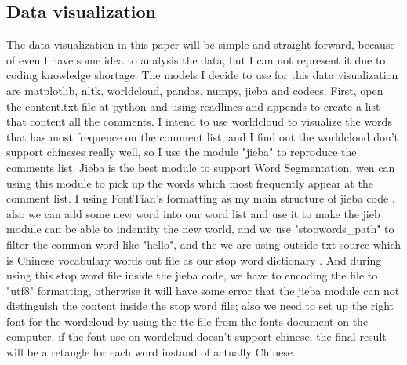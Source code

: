 \documentclass[sigconf]{acmart}
\begin{document}
\subsection{Data visualization}
The data visualization in this paper will be simple and straight forward, because of even I have some idea to analysis the data, but I can not represent it due to coding knowledge shortage. The models I decide to use for this data visualization are matplotlib, nltk, worldcloud, pandas, numpy, jieba and codecs. First, open the content.txt file at python and using readlines and appends to create a list that content all the comments. I intend to use worldcloud to visualize the words that has most frequence on the comment list, and I find out the worldcloud don't support chineses really well, so I use the module "jieba" to reproduce the comments list. Jieba is the best module to support Word Segmentation, wen can using this module to pick up the words which most frequently appear at the comment list\cite{method:08}. I using FontTian's formatting as my main structure of jieba code  \cite{method:08}, also we can add some new word into our word list and use it to make the jieb module can be able to indentity the new world, and we use "stopwords\_path" to filter the common word like "hello", and the we are using outside txt source which is Chinese vocabulary words out file as our stop word dictionary \cite{method:10}. And during using this stop word file inside the jieba code, we have to encoding the file to "utf8" formatting, otherwise it will have some error that the jieba module can not distinguish the content inside the stop word file; also we need to set up the right font for the wordcloud by using the ttc file from the fonts document on the computer, if the font use on wordcloud doesn't support chinese, the final result will be a retangle for each word instand of actually Chinese. 
\end{document}
